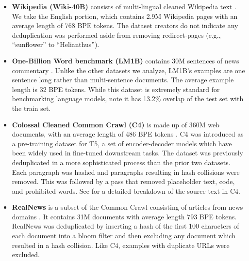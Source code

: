 \begin{itemize}
\item \textbf{Wikipedia (Wiki-40B)}
consists of multi-lingual cleaned Wikipedia text \citep{guo2020wiki40b}.
We take the English portion, which contains 2.9M Wikipedia pages with an average length of 768 BPE tokens.
The dataset creators do not indicate any deduplication was performed aside from removing redirect-pages (e.g., ``sunflower'' to ``Helianthus'').

\item \textbf{One-Billion Word benchmark (LM1B)}  contains 30M sentences of news commentary \citep{chelba2013one}.
Unlike the other datasets we analyze, LM1B's examples are one sentence long rather than multi-sentence documents.
The average example length is 32 BPE tokens.
While this dataset is extremely standard for benchmarking language models, \citet[Sec 4]{radford2019language} note it has 13.2\% overlap of the test set with the train set.

\item \textbf{Colossal Cleaned Common Crawl (C4)}
is made up of 360M web documents, with an average length of 486 BPE tokens \citep{raffel2019exploring}.
C4 was introduced as a pre-training dataset for T5, a set of encoder-decoder models which have been widely used in fine-tuned downstream tasks.
The dataset was previously deduplicated in a more sophisticated process
than the prior two datasets.
Each paragraph was hashed and paragraphs resulting in hash collisions were removed.
This was followed by a pass that removed placeholder text, code, and prohibited words.
See \citet{dodge2021documenting} for a detailed breakdown of the source text in C4.

\item \textbf{RealNews}
is a subset of the Common Crawl consisting of articles from news domains \citep{zellers2019defending}.
It contains 31M documents with average length 793 BPE tokens.
RealNews was deduplicated by inserting a hash of the first 100 characters of each document into a bloom filter \citep{bloom1970space} and then excluding any document which resulted in a hash collision.
Like C4, examples with duplicate URLs were excluded.

\end{itemize}

